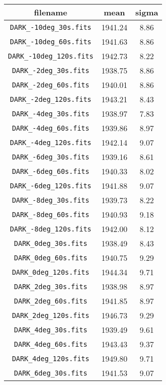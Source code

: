 \begin{table}[ht]
\centering
\begin{tabular}{ccc}
\toprule
filename & mean & sigma \\ 
\midrule 
\verb|DARK_-10deg_30s.fits| & \num{1941.24} & \num{8.86}\\
\verb|DARK_-10deg_60s.fits| & \num{1941.63} & \num{8.86}\\
\verb|DARK_-10deg_120s.fits| & \num{1942.73} & \num{8.22}\\
\verb|DARK_-2deg_30s.fits| & \num{1938.75} & \num{8.86}\\
\verb|DARK_-2deg_60s.fits| & \num{1940.01} & \num{8.86}\\
\verb|DARK_-2deg_120s.fits| & \num{1943.21} & \num{8.43}\\
\verb|DARK_-4deg_30s.fits| & \num{1938.97} & \num{7.83}\\
\verb|DARK_-4deg_60s.fits| & \num{1939.86} & \num{8.97}\\
\verb|DARK_-4deg_120s.fits| & \num{1942.14} & \num{9.07}\\
\verb|DARK_-6deg_30s.fits| & \num{1939.16} & \num{8.61}\\
\verb|DARK_-6deg_60s.fits| & \num{1940.33} & \num{8.02}\\
\verb|DARK_-6deg_120s.fits| & \num{1941.88} & \num{9.07}\\
\verb|DARK_-8deg_30s.fits| & \num{1939.73} & \num{8.22}\\
\verb|DARK_-8deg_60s.fits| & \num{1940.93} & \num{9.18}\\
\verb|DARK_-8deg_120s.fits| & \num{1942.00} & \num{8.12}\\
\verb|DARK_0deg_30s.fits| & \num{1938.49} & \num{8.43}\\
\verb|DARK_0deg_60s.fits| & \num{1940.75} & \num{9.29}\\
\verb|DARK_0deg_120s.fits| & \num{1944.34} & \num{9.71}\\
\verb|DARK_2deg_30s.fits| & \num{1938.98} & \num{8.97}\\
\verb|DARK_2deg_60s.fits| & \num{1941.85} & \num{8.97}\\
\verb|DARK_2deg_120s.fits| & \num{1946.73} & \num{9.29}\\
\verb|DARK_4deg_30s.fits| & \num{1939.49} & \num{9.61}\\
\verb|DARK_4deg_60s.fits| & \num{1943.43} & \num{9.37}\\
\verb|DARK_4deg_120s.fits| & \num{1949.80} & \num{9.71}\\
\verb|DARK_6deg_30s.fits| & \num{1941.53} & \num{9.07}\\

\end{tabular}
\end{table}
